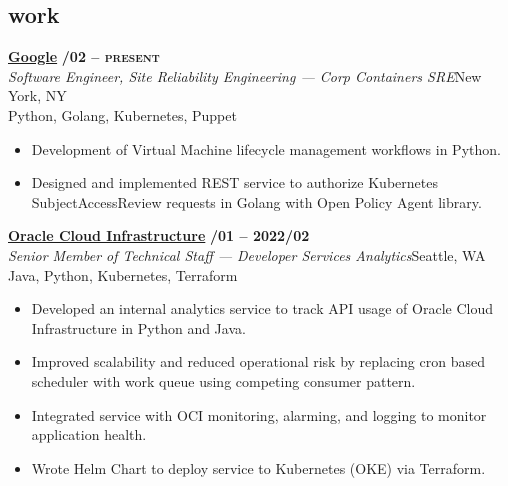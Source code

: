 \documentclass[margin,10pt]{res}
\begin{document}
\begin{resume}
\section{\sc \lsstyle work}
    \href{https://about.google/}{\textbf{Google}} \hfill \textsc{\bfseries{}/02 -- present}\\
    \textit{Software Engineer, Site Reliability Engineering --- Corp Containers SRE}\hfill New York, NY\\
    Python, Golang, Kubernetes, Puppet
    \begin{itemize}
        \item Development of Virtual Machine lifecycle management workflows in Python.
        \item Designed and implemented REST service to authorize Kubernetes SubjectAccessReview requests in Golang with Open Policy Agent library.
    \end{itemize}

    \href{https://www.oracle.com/cloud/}{\textbf{Oracle Cloud Infrastructure}} \hfill \textsc{\bfseries{}/01 -- 2022/02}\\
    \textit{Senior Member of Technical Staff --- Developer Services Analytics}\hfill Seattle, WA\\
    Java, Python, Kubernetes, Terraform
    \begin{itemize}
        \item Developed an internal analytics service to track API usage of Oracle Cloud Infrastructure in Python and Java.
        \item Improved scalability and reduced operational risk by replacing cron based scheduler with work queue using competing
        consumer pattern.
        \item Integrated service with OCI monitoring, alarming, and logging to monitor application health.
        \item Wrote Helm Chart to deploy service to Kubernetes (OKE) via Terraform.
    \end{itemize}


\end{resume}
\end{document}
